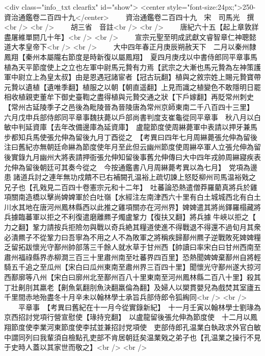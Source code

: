 <div class="info_txt clearfix" id="show">
<center style="font-size:24px;">250-資治通鑑卷二百四十九</center>
  　　資治通鑑卷二百四十九　宋　司馬光　撰<br />
<br />
　　胡三省　音註<br />
<br />
　　唐紀六十五【起上章敦牂盡屠維單閼几十年】<br />
<br />
　　宣宗元聖至明成武獻文睿智章仁神聰懿道大孝皇帝下<br />
<br />
　　大中四年春正月庚辰朔赦天下　二月以秦州隸鳳翔【秦州本屬隴右節度是時新復以屬鳳翔】　夏四月庚戌以中書侍郎同平章事馬植為天平節度使上之立也左軍中尉馬元贄有力焉【武宗之大漸也馬元贄為左神策護軍中尉立上為皇太叔】由是恩遇冠諸宦者【冠古玩翻】植與之敘宗姓上賜元贄寶帶元贄以遺植【遺唯季翻】植服之以朝【朝直遥翻】上見而識之植變色不敢隱明日罷相收植親吏董牟下御史臺鞫之盡得植與元贄交通之狀【下戶嫁翻】再貶常州刺史【常州古延陵季子之邑後為毗陵晉為晉陵唐為常州京師東南二千八百四十三里】　六月戊申兵部侍郎同平章事魏扶薨以戶部尚書判度支崔龜從同平章事　秋八月以白敏中判延資庫【去年改備邊庫為延資庫】　盧龍節度使周綝薨軍中表請以押牙兼馬步都知兵馬使張允伸為留後九月丁酉從之　【考異曰四年七月周綝薨張允伸為留後注曰舊紀亦無朝廷命綝為節度使年月至此但云幽州節度使周綝卒軍人立張允伸為留後實錄九月幽州大將表請押衙張允伸知留後事舊允伸傳曰大中四年戎帥周綝寢疾表允伸為留後朝廷可其奏今從之　今按通鑑書八月周綝薨考異以為七月】　党項為邊患諸道兵討之連年無功戍饋不已右補闕孔温裕上疏切諫上怒貶柳州司馬温裕戣之兄子也【孔戣見二百四十卷憲宗元和十二年】　吐蕃論恐熱遣僧莽羅藺真將兵於雞項關南造橋以擊尚婢婢軍於白吐嶺【水經注左南津西六十里有白土城城西北有白土川水其地在唐河州鳳林縣西以此推之雞項關亦在河州界】婢婢遣其將尚鐸羅榻藏將兵據臨蕃軍以拒之不利復遣磨離羆子燭盧鞏力【復扶又翻】將兵據牛峽以拒之【力之翻】鞏力請按兵拒險勿與戰以奇兵絶其糧道使進不得戰退不得還不過旬月其衆必潰羆子不從鞏力曰吾寧為不用之人不為敗軍之將稱疾歸鄯州羆子逆戰敗死婢婢糧乏留拓跋懷光守鄯州帥部落三千餘人就水草于甘州西【帥讀曰率宋白曰甘州西南至肅州福祿縣界赤柳澗三百三十里肅州南至吐蕃界四百里】恐熱聞婢婢棄鄯州自將輕騎五千追之至瓜州【宋白曰瓜州東南至肅州界三百四十里】聞懷光守鄯州遂大掠河西鄯廓等八州【宋白曰廓州北至鄯州百八十里東南至河州鳳林縣二百八十里】殺其丁壯劓刖其羸老【劓魚氣翻刖魚決翻羸倫為翻】及婦人以槊貫嬰兒為戲焚其室廬五千里間赤地殆盡冬十月辛未以翰林學士承旨兵部侍郎令狐綯同<br />
<br />
　　平章事　【考異曰舊紀在十一月今從實錄新紀】　十一月壬寅以翰林學士劉瑑為京西招討党項行營宣慰使【瑑持兖翻】　以盧龍留後張允伸為節度使　十二月以鳳翔節度使李業河東節度使李拭並兼招討党項使　吏部侍郎孔温業白執政求外官白敏中謂同列曰我輩須自檢點孔吏部不肯居朝廷矣温業戣之弟子也【孔温業之操行不見于史時人蓋以其家世而敬之】<br />
<br />
